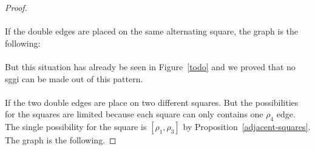 \begin{proof}
\paragraph{}
If the double edges are placed on the same alternating square, the graph is the following:

\begin{figure}[H]
  \begin{center}
    \caption{}
  \end{center}
\end{figure}

\paragraph{}
But this situation has already be seen in Figure~\ref{todo} and we proved that no sggi can be made out of this pattern.

\paragraph{}
If the two double edges are place on two different squares. But the possibilities for the squares are limited because each square can only contains one $\rho_4$ edge. The single possibility for the square is $[\rho_1, \rho_3]$ by Proposition~\ref{adjacent-squares}. The graph is the following.


\end{proof}

